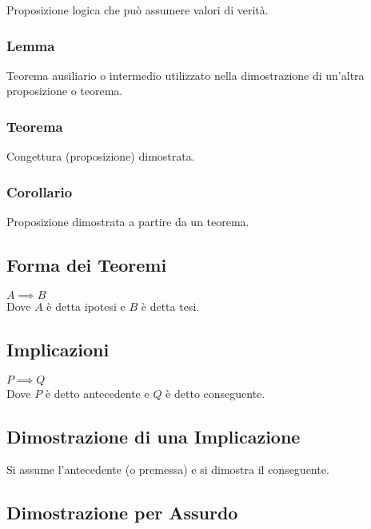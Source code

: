 \documentclass[a4paper, twoside, italian, 11pt]{book}
\begin{document}
\noindent
Proposizione logica che può assumere valori di verità.


\subsubsection{Lemma}

\noindent
Teorema ausiliario o intermedio utilizzato nella dimostrazione di un'altra proposizione o teorema.


\subsubsection{Teorema}

\noindent
Congettura (proposizione) dimostrata.


\subsubsection{Corollario}

\noindent
Proposizione dimostrata a partire da un teorema.


\subsection{Forma dei Teoremi}

\noindent
$A \implies B$ \\

\noindent
Dove $A$ è detta ipotesi e $B$ è detta tesi.


\subsection{Implicazioni}

\noindent
$P \implies Q$ \\

\noindent
Dove $P$ è detto antecedente e $Q$ è detto conseguente.


\subsection{Dimostrazione di una Implicazione}

\noindent
Si assume l'antecedente (o premessa) e si dimostra il conseguente.


\subsection{Dimostrazione per Assurdo}
\end{document}
